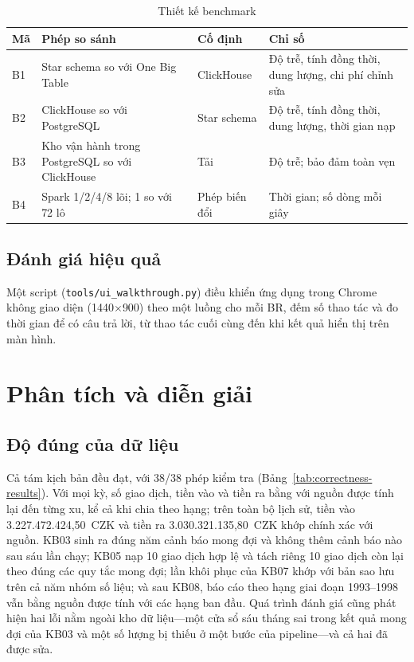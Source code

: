 \documentclass[peerreview]{IEEEtran}
\begin{document}
\begin{table}[!t]
\centering
\caption{Thiết kế benchmark}
\label{tab:bench}
\footnotesize
\setlength{\tabcolsep}{3pt}
\begin{tabular}{l L{2.5cm} L{1.7cm} L{2.9cm}}
\toprule
\textbf{Mã} & \textbf{Phép so sánh} & \textbf{Cố định} & \textbf{Chỉ số} \\
\midrule
B1 & Star schema so với One Big Table & ClickHouse & Độ trễ, tính đồng thời, dung lượng, chi phí chỉnh sửa \\
B2 & ClickHouse so với PostgreSQL & Star schema & Độ trễ, tính đồng thời, dung lượng, thời gian nạp \\
B3 & Kho vận hành trong PostgreSQL so với ClickHouse & Tải & Độ trễ; bảo đảm toàn vẹn \\
B4 & Spark 1/2/4/8 lõi; 1 so với 72 lô & Phép biến đổi & Thời gian; số dòng mỗi giây \\
\bottomrule
\end{tabular}
\end{table}

\subsection{Đánh giá hiệu quả}
Một script (\texttt{tools/ui\_walkthrough.py}) điều khiển ứng dụng trong Chrome không giao
diện (1440$\times$900) theo một luồng cho mỗi BR, đếm số thao tác và đo thời gian để có câu
trả lời, từ thao tác cuối cùng đến khi kết quả hiển thị trên màn hình.


\section{Phân tích và diễn giải}
\label{sec:analysis}

\subsection{Độ đúng của dữ liệu}
Cả tám kịch bản đều đạt, với 38/38 phép kiểm tra (Bảng~\ref{tab:correctness-results}). Với
mọi kỳ, số giao dịch, tiền vào và tiền ra bằng với nguồn được tính lại đến từng xu, kể cả khi
chia theo hạng; trên toàn bộ lịch sử, tiền vào 3.227.472.424,50~CZK và tiền ra
3.030.321.135,80~CZK khớp chính xác với nguồn. KB03 sinh ra đúng năm cảnh báo mong đợi và
không thêm cảnh báo nào sau sáu lần chạy; KB05 nạp 10 giao dịch hợp lệ và tách riêng 10 giao
dịch còn lại theo đúng các quy tắc mong đợi; lần khôi phục của KB07 khớp với bản sao lưu trên
cả năm nhóm số liệu; và sau KB08, báo cáo theo hạng giai đoạn 1993--1998 vẫn bằng nguồn được
tính với các hạng ban đầu. Quá trình đánh giá cũng phát hiện hai lỗi nằm ngoài kho dữ
liệu---một cửa sổ sáu tháng sai trong kết quả mong đợi của KB03 và một số lượng bị thiếu ở một
bước của pipeline---và cả hai đã được sửa.
\end{document}
